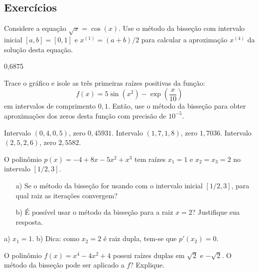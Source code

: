 
\fi

\subsection*{Exercícios}

\begin{exer}Considere a equação $\sqrt{x}=\cos(x)$. Use o método da bisseção com intervalo inicial $[a, b] = [0, 1]$ e $x^{(1)} = (a+b)/2$ para calcular a aproximação $x^{(4)}$ da solução desta equação.
\end{exer}
\begin{resp}
  0,6875
\end{resp}

\begin{exer} Trace o gráfico e isole as três primeiras raízes positivas da função:
  \begin{equation}
    f(x)=5\sin(x^2)-\exp\left({\frac{x}{10}}\right)
  \end{equation}
em intervalos de comprimento $0,1$. Então, use o método da bisseção para obter aproximações dos zeros desta função com precisão de $10^{-5}$.
\end{exer}
\begin{resp}
  Intervalo $(0,4, 0,5)$, zero $0,45931$. Intervalo $(1,7, 1,8)$, zero $1,7036$. Intervalo $(2,5, 2,6)$, zero $2,5582$.
\end{resp}

\begin{exer}\label{exer:raizes_multiplas}
  O polinômio $p(x) = -4 + 8x - 5x^2 + x^3$ tem raízes $x_1=1$ e $x_2=x_3=2$ no intervalo $[1/2, 3]$.
  \begin{itemize}
  \item[a)] Se o método da bisseção for usando com o intervalo inicial $[1/2, 3]$, para qual raiz as iterações convergem?
  \item[b)] É possível usar o método da bisseção para a raiz $x=2$? Justifique sua resposta.
  \end{itemize}
\end{exer}
\begin{resp}
  a) $x_1=1$. b) Dica: como $x_2=2$ é raiz dupla, tem-se que $p'(x_2) = 0$.
\end{resp}

\begin{exer}\label{prob_raiz_dupla} O polinômio $f(x)=x^4-4x^2+4$ possui raízes duplas em $\sqrt{2}$ e $-\sqrt{2}$. O método da bisseção pode ser aplicado a $f$? Explique.
\end{exer}


